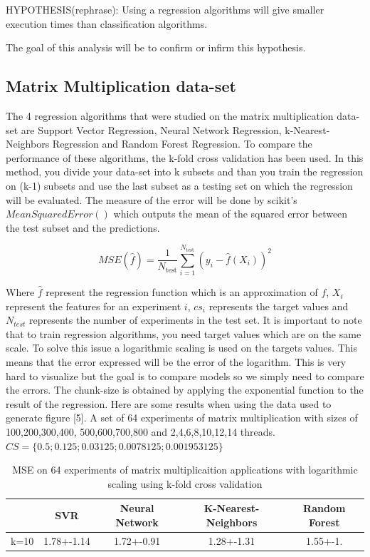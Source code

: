 HYPOTHESIS(rephrase): Using a regression algorithms will give smaller execution times than classification algorithms.
 
  The goal of this analysis will be to confirm or infirm this hypothesis.


\subsection{Matrix Multiplication data-set}

The 4 regression algorithms that were studied on the matrix multiplication data-set are Support Vector Regression, Neural Network Regression, k-Nearest-Neighbors Regression and Random Forest Regression. To compare the performance of these algorithms, the k-fold cross validation has been used. In this method, you divide your data-set into k subsets and than you train the regression on (k-1) subsets and use the last subset as a testing set on which the regression will be evaluated. The measure of the error will be done by scikit's $MeanSquaredError()$ which outputs the mean of the squared error between the test subset and the predictions.

$$MSE(\hat{f})=\frac{1}{N_\text{test}}\sum_{i=1}^{N_\text{test}}(y_i-\hat{f}(X_i))^2$$

Where $\hat{f}$ represent the regression function which is an approximation of $f$, $X_i$ represent the features for an experiment $i$, $cs_i$ represents the target values and $N_{test}$ represents the number of experiments in the test set. It is important to note that to train regression algorithms, you need target values which are on the same scale. To solve this issue a logarithmic scaling is used on the targets values. This means that the error expressed will be the error of the logarithm. This is very hard to visualize but the goal is to compare models so we simply need to compare the errors. The chunk-size is obtained by applying the exponential function to the result of the regression.
Here are some results when using the data used to generate  figure [5]. A set of 64 experiments of matrix multiplication with sizes of 100,200,300,400, 500,600,700,800 and 2,4,6,8,10,12,14 threads.$CS=\{0.5;0.125;0.03125;0.0078125;0.001953125\}$

\begin{table}[h]
	\centering
	\caption{MSE on 64 experiments of matrix multiplicaition applications with logarithmic scaling using k-fold cross validation}
	\label{my-label}
	\begin{tabular}{|c|c|c|c|c|}
		\hline
		& SVR           & Neural Network & K-Nearest-Neighbors & Random Forest \\ \hline
		k=10 & 1.78+-1.14  & 1.72+-0.91    & 1.28+-1.31        & 1.55+-1. \\ \hline
	\end{tabular}
\end{table}

